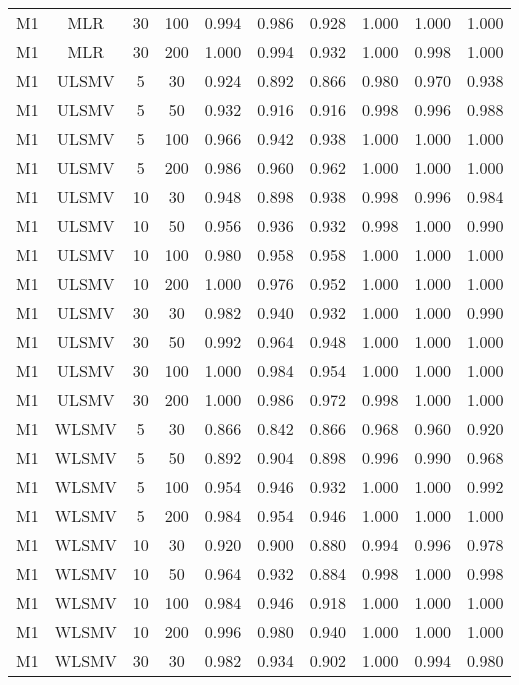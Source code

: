 {\begin{longtable}[!tbp]{@{\extracolsep{\fill}}lccccccccc}
  M1 & MLR & 30 & 100 & 0.994 & 0.986 & 0.928 & 1.000 & 1.000 & 1.000 \\ 
  M1 & MLR & 30 & 200 & 1.000 & 0.994 & 0.932 & 1.000 & 0.998 & 1.000 \\ 
  M1 & ULSMV & 5 & 30 & 0.924 & 0.892 & 0.866 & 0.980 & 0.970 & 0.938 \\ 
  M1 & ULSMV & 5 & 50 & 0.932 & 0.916 & 0.916 & 0.998 & 0.996 & 0.988 \\ 
  M1 & ULSMV & 5 & 100 & 0.966 & 0.942 & 0.938 & 1.000 & 1.000 & 1.000 \\ 
  M1 & ULSMV & 5 & 200 & 0.986 & 0.960 & 0.962 & 1.000 & 1.000 & 1.000 \\ 
  M1 & ULSMV & 10 & 30 & 0.948 & 0.898 & 0.938 & 0.998 & 0.996 & 0.984 \\ 
  M1 & ULSMV & 10 & 50 & 0.956 & 0.936 & 0.932 & 0.998 & 1.000 & 0.990 \\ 
  M1 & ULSMV & 10 & 100 & 0.980 & 0.958 & 0.958 & 1.000 & 1.000 & 1.000 \\ 
  M1 & ULSMV & 10 & 200 & 1.000 & 0.976 & 0.952 & 1.000 & 1.000 & 1.000 \\ 
  M1 & ULSMV & 30 & 30 & 0.982 & 0.940 & 0.932 & 1.000 & 1.000 & 0.990 \\ 
  M1 & ULSMV & 30 & 50 & 0.992 & 0.964 & 0.948 & 1.000 & 1.000 & 1.000 \\ 
  M1 & ULSMV & 30 & 100 & 1.000 & 0.984 & 0.954 & 1.000 & 1.000 & 1.000 \\ 
  M1 & ULSMV & 30 & 200 & 1.000 & 0.986 & 0.972 & 0.998 & 1.000 & 1.000 \\ 
  M1 & WLSMV & 5 & 30 & 0.866 & 0.842 & 0.866 & 0.968 & 0.960 & 0.920 \\ 
  M1 & WLSMV & 5 & 50 & 0.892 & 0.904 & 0.898 & 0.996 & 0.990 & 0.968 \\ 
  M1 & WLSMV & 5 & 100 & 0.954 & 0.946 & 0.932 & 1.000 & 1.000 & 0.992 \\ 
  M1 & WLSMV & 5 & 200 & 0.984 & 0.954 & 0.946 & 1.000 & 1.000 & 1.000 \\ 
  M1 & WLSMV & 10 & 30 & 0.920 & 0.900 & 0.880 & 0.994 & 0.996 & 0.978 \\ 
  M1 & WLSMV & 10 & 50 & 0.964 & 0.932 & 0.884 & 0.998 & 1.000 & 0.998 \\ 
  M1 & WLSMV & 10 & 100 & 0.984 & 0.946 & 0.918 & 1.000 & 1.000 & 1.000 \\ 
  M1 & WLSMV & 10 & 200 & 0.996 & 0.980 & 0.940 & 1.000 & 1.000 & 1.000 \\ 
  M1 & WLSMV & 30 & 30 & 0.982 & 0.934 & 0.902 & 1.000 & 0.994 & 0.980 \\ 

\end{longtable}}
